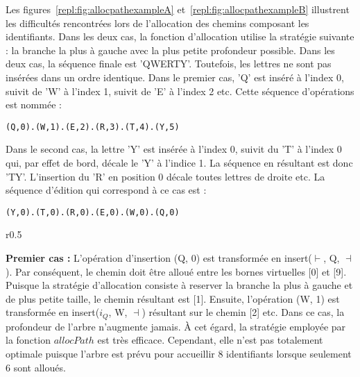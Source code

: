 Les figures~\ref{repl:fig:allocpathexampleA} et~\ref{repl:fig:allocpathexampleB}
illustrent les difficultés rencontrées lors de l'allocation des chemins
composant les identifiants. Dans les deux cas, la fonction d'allocation utilise
la stratégie suivante : la branche la plus à gauche avec la plus petite
profondeur possible. Dans les deux cas, la séquence finale est
'QWERTY'. Toutefois, les lettres ne sont pas insérées dans un ordre
identique. Dans le premier cas, 'Q' est inséré à l'index 0, suivit de 'W' à
l'index 1, suivit de 'E' à l'index 2 etc. Cette séquence d'opérations est nommée
 :
\begin{alltt}
\centering(Q,0).(W,1).(E,2).(R,3).(T,4).(Y,5)
\end{alltt}
Dans le second cas, la lettre 'Y' est insérée à l'index 0, suivit du 'T' à
l'index 0 qui, par effet de bord, décale le 'Y' à l'indice 1. La séquence en
résultant est donc 'TY'. L'insertion du 'R' en position 0 décale toutes lettres
de droite etc. La séquence d'édition qui correspond à ce cas est :
\begin{alltt}
\centering(Y,0).(T,0).(R,0).(E,0).(W,0).(Q,0)
\end{alltt}

\begin{wrapfigure}{r}{0.5\textwidth}
  \vspace{-15pt}
  \centering
  
  \caption{\label{repl:fig:allocpathexampleA}Allocation quasi-optimale}
  \vspace{-15pt}
\end{wrapfigure}

\textbf{Premier cas :} L'opération d'insertion (Q, 0) est transformée en
insert($\vdash$, Q, $\dashv$). Par conséquent, le chemin doit être alloué entre
les bornes virtuelles [0] et [9]. Puisque la stratégie d'allocation consiste à
reserver la branche la plus à gauche et de plus petite taille, le chemin
résultant est [1]. Ensuite, l'opération (W, 1) est transformée en insert($i_Q$,
W, $\dashv$) résultant sur le chemin [2] etc.  Dans ce cas, la profondeur de
l'arbre n'augmente jamais. À cet égard, la stratégie employée par la fonction
$allocPath$ est très efficace. Cependant, elle n'est pas totalement optimale
puisque l'arbre est prévu pour accueillir 8 identifiants lorsque seulement 6
sont alloués.

